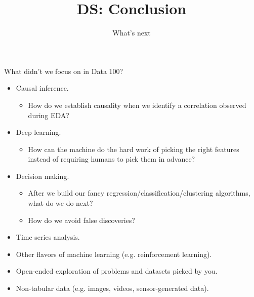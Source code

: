 \documentclass[aspectratio=169]{../latex_main/tntbeamer}  %
\title[Introduction]{DS: Conclusion}
\subtitle{What’s next}
\begin{document}
	
	\maketitle
	\begin{frame}{What didn’t we focus on in Data 100?}
	    \begin{itemize}
	        \item Causal inference.
	        \begin{itemize}
	            \item How do we establish causality when we identify a correlation observed during EDA?
	        \end{itemize}
	        \item Deep learning.
	        \begin{itemize}
	            \item How can the machine do the hard work of picking the right features instead of requiring humans to pick them in advance?
	        \end{itemize}
	        \item Decision making.
	        \begin{itemize}
	            \item After we build our fancy regression/classification/clustering algorithms, what do we do next?
	            \item How do we avoid false discoveries?
	        \end{itemize}
	        \item Time series analysis.
	        \item Other flavors of machine learning (e.g. reinforcement learning).
	        \item Open-ended exploration of problems and datasets picked by you.
	        \item Non-tabular data (e.g. images, videos, sensor-generated data).
	    \end{itemize}
	\end{frame}
	
\end{document}
